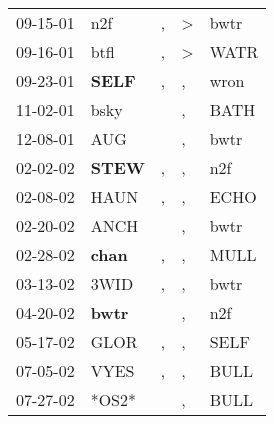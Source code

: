 \begin{supertabular}{p{0.07\textwidth}p{0.06\textwidth}p{0.02\textwidth}p{0.02\textwidth}p{0.06\textwidth}}
          09-15-01\textsuperscript{} &            n2f\textsuperscript{} &                , &     \textgreater &           bwtr\textsuperscript{} \\
          09-16-01\textsuperscript{} &           btfl\textsuperscript{} &                , &     \textgreater &           WATR\textsuperscript{} \\
          09-23-01\textsuperscript{} &  \textbf{SELF\textsuperscript{}} &                , &                , &           wron\textsuperscript{} \\
          11-02-01\textsuperscript{} &           bsky\textsuperscript{} &                  &                , &           BATH\textsuperscript{} \\
          12-08-01\textsuperscript{} &            AUG\textsuperscript{} &                  &                , &           bwtr\textsuperscript{} \\
          02-02-02\textsuperscript{} &  \textbf{STEW\textsuperscript{}} &                , &                , &            n2f\textsuperscript{} \\
          02-08-02\textsuperscript{} &           HAUN\textsuperscript{} &                , &                , &           ECHO\textsuperscript{} \\
          02-20-02\textsuperscript{} &           ANCH\textsuperscript{} &                  &                , &           bwtr\textsuperscript{} \\
          02-28-02\textsuperscript{} &  \textbf{chan\textsuperscript{}} &                , &                , &           MULL\textsuperscript{} \\
          03-13-02\textsuperscript{} &           3WID\textsuperscript{} &                , &                , &           bwtr\textsuperscript{} \\
          04-20-02\textsuperscript{} &  \textbf{bwtr\textsuperscript{}} &                  &                , &            n2f\textsuperscript{} \\
          05-17-02\textsuperscript{} &           GLOR\textsuperscript{} &                , &                , &           SELF\textsuperscript{} \\
          07-05-02\textsuperscript{} &           VYES\textsuperscript{} &                , &                , &           BULL\textsuperscript{} \\
          07-27-02\textsuperscript{} &                            *OS2* &                  &                , &           BULL\textsuperscript{} \\

\end{supertabular}
